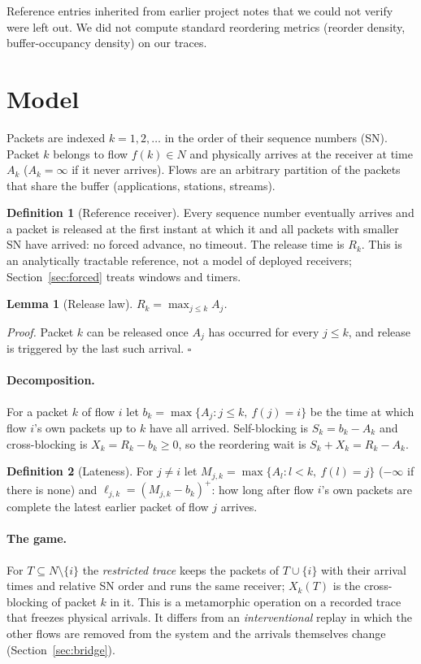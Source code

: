 \documentclass[11pt]{article}
\newtheorem{lemma}{Lemma}
\theoremstyle{definition}
\newtheorem{definition}{Definition}
\begin{document}
Reference entries inherited from earlier project notes that we could not verify were left out. We did not compute standard reordering metrics (reorder density, buffer-occupancy density) on our traces.

\section{Model}\label{sec:model}
Packets are indexed $k=1,2,\dots$ in the order of their sequence numbers (SN). Packet $k$ belongs to flow $f(k)\in N$ and physically arrives at the receiver at time $A_k$ ($A_k=\infty$ if it never arrives). Flows are an arbitrary partition of the packets that share the buffer (applications, stations, streams).

\begin{definition}[Reference receiver]\label{def:ir}
Every sequence number eventually arrives and a packet is released at the first instant at which it and all packets with smaller SN have arrived: no forced advance, no timeout. The release time is $R_k$. This is an analytically tractable reference, not a model of deployed receivers; Section~\ref{sec:forced} treats windows and timers.
\end{definition}
\begin{lemma}[Release law]\label{lem:release}
$R_k=\max_{j\le k}A_j$.
\end{lemma}
\emph{Proof.} Packet $k$ can be released once $A_j$ has occurred for every $j\le k$, and release is triggered by the last such arrival. \hfill$\square$

\paragraph{Decomposition.} For a packet $k$ of flow $i$ let $b_k=\max\{A_j:j\le k,\ f(j)=i\}$ be the time at which flow $i$'s own packets up to $k$ have all arrived. Self-blocking is $S_k=b_k-A_k$ and cross-blocking is $X_k=R_k-b_k\ge0$, so the reordering wait is $S_k+X_k=R_k-A_k$.

\begin{definition}[Lateness]
For $j\ne i$ let $M_{j,k}=\max\{A_l:l<k,\ f(l)=j\}$ ($-\infty$ if there is none) and $\ell_{j,k}=(M_{j,k}-b_k)^+$: how long after flow $i$'s own packets are complete the latest earlier packet of flow $j$ arrives.
\end{definition}
\paragraph{The game.} For $T\subseteq N\setminus\{i\}$ the \emph{restricted trace} keeps the packets of $T\cup\{i\}$ with their arrival times and relative SN order and runs the same receiver; $X_k(T)$ is the cross-blocking of packet $k$ in it. This is a metamorphic operation on a recorded trace that freezes physical arrivals. It differs from an \emph{interventional} replay in which the other flows are removed from the system and the arrivals themselves change (Section~\ref{sec:bridge}).
\end{document}
